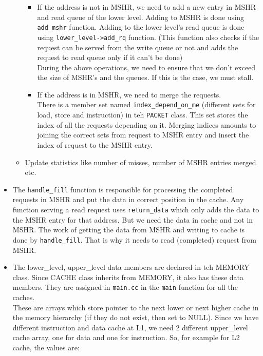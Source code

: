 \documentclass[11pt, swedish, openany]{book}
\begin{document}
\begin{itemize}
\begin{itemize}
                    \begin{itemize}
                        \item If the address is not in MSHR, we need to add a new entry in MSHR and read queue of the lower level. Adding to MSHR is done using \texttt{add\_mshr} function. Adding to the lower level's read queue is done using \texttt{lower\_level->add\_rq} function. (This function also checks if the request can be served from the write queue or not and adds the request to read queue only if it can't be done)\\
                              During the above operations, we need to ensure that we don't exceed the size of MSHR's and the queues. If this is the case, we must stall.
                        \item If the address is in MSHR, we need to merge the requests.\\
                              There is a member set named  \texttt{index\_depend\_on\_me} (different sets for load, store and instruction) in teh \texttt{PACKET} class. This set stores the index of all the requests depending on it. Merging indices amounts to joining the correct sets from request to MSHR entry and insert the index of request to the MSHR entry.
                    \end{itemize}
              \item Update statistics like number of misses, number of MSHR entries merged etc.
          \end{itemize}
    \item The \texttt{handle\_fill} function is responsible for processing the completed requests in MSHR and put the data in correct position in the cache. Any function serving a read request uses \texttt{return\_data} which only adds the data to the MSHR entry for that address. But we need the data in cache and not in MSHR. The work of getting the data from MSHR and writing to cache is done by \texttt{handle\_fill}. That is why it needs to read (completed) request from MSHR.
    \item The lower\_level, upper\_level data members are declared in teh MEMORY class. Since CACHE class inherits from MEMORY, it also has these data members. They are assigned in \texttt{main.cc} in the \texttt{main} function for all the caches.\\
          These are arrays which store pointer to the next lower or next higher cache in the memory hierarchy (if they do not exist, then set to NULL). Since we have different instruction and data cache at L1, we need 2 different upper\_level cache array, one for data and one for instruction. So, for example for L2 cache, the values are:\\

\end{itemize}
\end{document}
